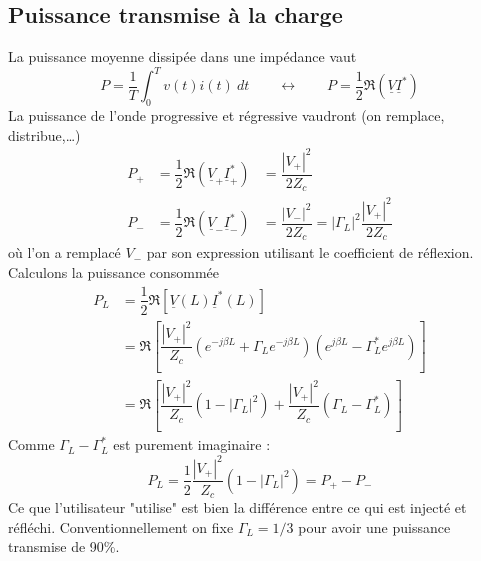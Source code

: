 	\subsection{Puissance transmise à la charge}
	La puissance moyenne dissipée dans une impédance vaut 
	\begin{equation}
	P = \dfrac{1}{T}\int_0^T v(t)i(t)\ dt\qquad\leftrightarrow\qquad P=\dfrac{1}{2}
	\Re(\underline{V}\underline{I}^*)
	\end{equation}
	La puissance de l'onde progressive et régressive vaudront (on remplace, distribue,\dots) 
	\begin{equation}
	\begin{array}{lll}
	P_+ &= \dfrac{1}{2}	\Re(\underline{V}_+\underline{I}_+^*) &= \dfrac{|V_+|^2}{2Z_c}\\
	P_- &= \dfrac{1}{2}	\Re(\underline{V}_-\underline{I}_-^*) &= \dfrac{|V_-|^2}{2Z_c}	 
	= |\Gamma_L|^2\dfrac{|V_+|^2}{2Z_c}
	\end{array}
	\end{equation}
	où l'on a remplacé $V_-$ par son expression utilisant le coefficient de réflexion.
	Calculons la puissance consommée
	\begin{equation}
	\begin{split}
	P_L &= \dfrac{1}{2}\Re[\underline{V}(L)\underline{I}^*(L)]\\
	&= \Re\left[\dfrac{|V_+|^2}{Z_c}\left(e^{-j\beta L}+\Gamma_Le^{-j\beta L}\right)
	\left(e^{j\beta L}-\Gamma_L^*e^{j\beta L}\right)\right]\\
	&=\Re\left[\dfrac{|V_+|^2}{Z_c}(1-|\Gamma_L|^2) + \dfrac{|V_+|^2}{Z_c}(\Gamma_L-
	\Gamma_L^*)\right]
	\end{split}
	\end{equation}
	Comme $\Gamma_L-\Gamma_L^*$ est purement imaginaire :
	\begin{equation}
	P_L = \dfrac{1}{2}\dfrac{|V_+|^2}{Z_c}(1-|\Gamma_L|^2) = P_+-P_-
	\end{equation}
	Ce que l'utilisateur "utilise" est bien la différence entre ce qui est injecté et 
	réfléchi. Conventionnellement on fixe $\Gamma_L=1/3$ pour avoir une puissance 
	transmise de 90\%.
	
